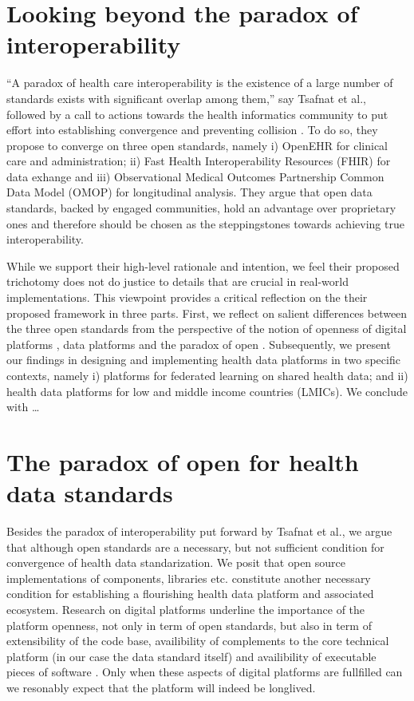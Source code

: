 \documentclass[
  authoryear]{elsarticle}
\begin{document}
\section{Looking beyond the paradox of
interoperability}\label{looking-beyond-the-paradox-of-interoperability}

``A paradox of health care interoperability is the existence of a large
number of standards exists with significant overlap among them,'' say
Tsafnat et al., followed by a call to actions towards the health
informatics community to put effort into establishing convergence and
preventing collision \citep{tsafnat2024converge}. To do so, they propose
to converge on three open standards, namely i) OpenEHR for clinical care
and administration; ii) Fast Health Interoperability Resources (FHIR)
for data exhange and iii) Observational Medical Outcomes Partnership
Common Data Model (OMOP) for longitudinal analysis. They argue that open
data standards, backed by engaged communities, hold an advantage over
proprietary ones and therefore should be chosen as the steppingstones
towards achieving true interoperability.

While we support their high-level rationale and intention, we feel their
proposed trichotomy does not do justice to details that are crucial in
real-world implementations. This viewpoint provides a critical
reflection on the their proposed framework in three parts. First, we
reflect on salient differences between the three open standards from the
perspective of the notion of openness of digital platforms
\citep{dereuver2018digital}, data platforms \citep{dereuver2022openness}
and the paradox of open \citep{keller2021paradox}. Subsequently, we
present our findings in designing and implementing health data platforms
in two specific contexts, namely i) platforms for federated learning on
shared health data; and ii) health data platforms for low and middle
income countries (LMICs). We conclude with \ldots{}

\section{The paradox of open for health data
standards}\label{the-paradox-of-open-for-health-data-standards}

Besides the paradox of interoperability put forward by Tsafnat et al.,
we argue that although open standards are a necessary, but not
sufficient condition for convergence of health data standarization. We
posit that open source implementations of components, libraries etc.
constitute another necessary condition for establishing a flourishing
health data platform and associated ecosystem. Research on digital
platforms underline the importance of the platform openness, not only in
term of open standards, but also in term of extensibility of the code
base, availibility of complements to the core technical platform (in our
case the data standard itself) and availibility of executable pieces of
software \citep{dereuver2018digital}. Only when these aspects of digital
platforms are fullfilled can we resonably expect that the platform will
indeed be longlived.
\end{document}

